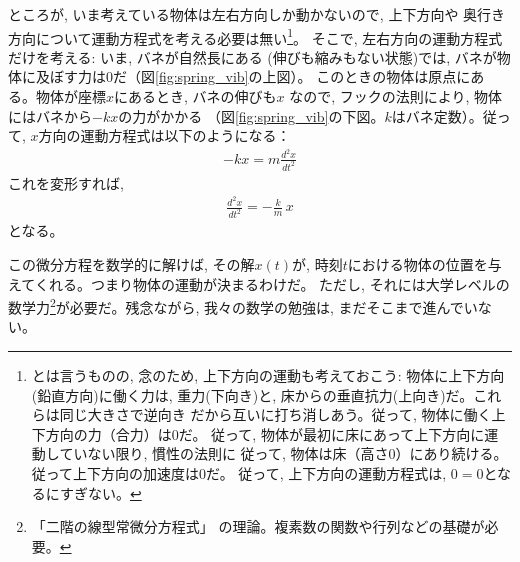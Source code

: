 ところが, いま考えている物体は左右方向しか動かないので, 上下方向や
奥行き方向について運動方程式を考える必要は無い\footnote{とは言うものの, 
念のため, 上下方向の運動も考えておこう: 物体に上下方向(鉛直方向)に働く力は, 
重力(下向き)と, 床からの垂直抗力(上向き)だ。これらは同じ大きさで逆向き
だから互いに打ち消しあう。従って, 物体に働く上下方向の力（合力）は0だ。
従って, 物体が最初に床にあって上下方向に運動していない限り, 慣性の法則に
従って, 物体は床（高さ0）にあり続ける。従って上下方向の加速度は0だ。
従って, 上下方向の運動方程式は, $0=0$となるにすぎない。}。
そこで, 左右方向の運動方程式だけを考える: いま, バネが自然長にある
(伸びも縮みもない状態)では, バネが物体に及ぼす力は0だ（図\ref{fig:spring_vib}の上図）。
このときの物体は原点にある。物体が座標$x$にあるとき, バネの伸びも$x$
なので, フックの法則により, 物体にはバネから$-kx$の力がかかる
（図\ref{fig:spring_vib}の下図。$k$はバネ定数）。従って, $x$方向の運動方程式は以下のようになる：
\begin{eqnarray}
-kx=m\frac{d^2x}{dt^2}
\end{eqnarray}
これを変形すれば, 
\begin{eqnarray}
\frac{d^2x}{dt^2}=-\frac{k}{m}\,x\label{eq:spring_vib2}
\end{eqnarray}
となる。\mv

この微分方程を数学的に解けば, その解$x(t)$が, 
時刻$t$における物体の位置を与えてくれる。つまり物体の運動が決まるわけだ。
ただし, それには大学レベルの数学力\footnote{「二階の線型常微分方程式」
の理論。複素数の関数や行列などの基礎が必要。}が必要だ。残念ながら, 
我々の数学の勉強は, まだそこまで進んでいない。

